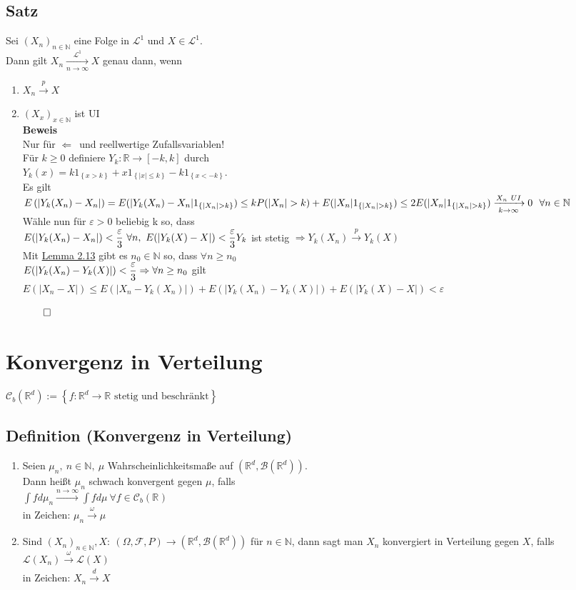 \documentclass[german,10pt,oneside, fleqn, a4paper]{article}
\newcommand {\R}	{\mathbb{R}}
\newcommand {\N}	{\mathbb{N}}
\newcommand{\Ra}	{\Rightarrow}
\newcommand{\La}	{\Leftarrow}
\newcommand{\brc}[1]{\left(#1\right)}
\newcommand{\brac}[1]{\left\lbrace #1\right\rbrace}
\newcommand{\folge}[3][\N]{\left(#2_#3\right)_{#3\in #1}}
\newcommand{\QED}{\begin{flushright}$\qed$\end{flushright}}
\newcommand{\mc}[1]{\mathcal{#1}}
\newcommand{\lp}[1]{\mc{L}^{#1}}
\newcommand{\la}{\lp{1}}
\newcommand{\beweis}{\textbf{Beweis}\\}
\newcommand{\toinf}{\rightarrow\infty}
\newcommand{\fn}[1][n]{\ \forall #1\in\N}
\newcommand{\1}[1]{1_{#1}}
\newcommand{\2}[1]{\1{\brac{#1}}}
\newcommand{\xr}[2][]{\xrightarrow[#1]{#2}}
\newcommand{\cb}[1][d]{\mc{C}_b\brc{\R^{#1}}}
\newcommand{\rbor}[1][d]{\brc{\R^{#1},\mc{B}\brc{\R^{#1}}}}
\newcommand{\raum}{\brc{\Omega,\mc{F},P}}
\begin{document}
\subsection{Satz}
Sei $\folge{X}{n}$ eine Folge in $\la$ und $X\in\la$. \\
Dann gilt $X_n\xrightarrow[n\toinf]{\la}X$ genau dann, wenn
\begin{enumerate}[label=(\roman*)]
\item $X_n\xrightarrow {p}X$
\item $\folge{X}{x}$ ist UI\\
\beweis
Nur für \glqq$\La$\grqq\ und reellwertige Zufallsvariablen!\\
Für $k\geq 0$ definiere $Y_k:\R\rightarrow\left[ -k,k\right]$ durch\\ $Y_k(x)=k\1{\brac{x>k}}+x\1{\brac{|x|\leq k}}-k\1{\brac{x<-k}}$.\\
Es gilt \\
$E\brc{|Y_k(X_n)-X_n|}=E(|Y_k(X_n)-X_n|\1{\brac{|X_n|>k}})\\
\leq kP(|X_n|>k)+E(|X_n|\1{\brac{|X_n|>k}})\\
\leq 2E(|X_n|\1{\brac{|X_n|>k}})\xrightarrow[k\toinf]{X_n\ UI}0\ \fn$\\
Wähle nun für $\varepsilon>0$ beliebig k so, dass\\
$E(|Y_k(X_n)-X_n|)<\dfrac{\varepsilon}{3}\ \forall n,\ E(|Y_k(X)-X|)<\dfrac{\varepsilon}{3}\\
Y_k$ ist stetig $\Ra Y_k(X_n)\xr{p}Y_k(X)$\\
Mit \hyperref[2.13]{Lemma 2.13} gibt es $n_0\in\N$ so, dass $\forall n\geq  n_0$ \\
$E(|Y_k(X_n)-Y_k(X)|)<\dfrac{\varepsilon}{3}\\
\Ra \forall n\geq n_0$ gilt $E(|X_n-X|)\leq E(|X_n-Y_k(X_n)|)+E(|Y_k(X_n)-Y_k(X)|)+E(|Y_k(X)-X|)<\varepsilon$\QED
\end{enumerate}






\pagebreak
\section{Konvergenz in Verteilung}
$\cb:=\brac{f:\R ^d\rightarrow \R \text{ stetig und beschränkt}}$
\subsection{Definition (Konvergenz in Verteilung)}
\begin{enumerate}[label=(\alph*)]
\item Seien $\mu_n,\ n\in\N,\ \mu$ Wahrscheinlichkeitsmaße auf $\rbor$. \\
Dann heißt $\mu_n$ schwach konvergent gegen $\mu$, falls\\
$\int f d\mu_n\xr{n\toinf}\int fd\mu\ \forall f\in\cb[]$\\
in Zeichen: $\mu_n\xr{\omega}\mu$
\item Sind $\folge{X}{n}, X:\ \raum\rightarrow\rbor$ für $n\in\N$, dann sagt man $X_n$ konvergiert in Verteilung gegen $X$, falls $\mc{L}(X_n)\xr{\omega}\mc{L}(X)$\\
in Zeichen: $X_n\xr{d}X$
\end{enumerate}
\end{document}
